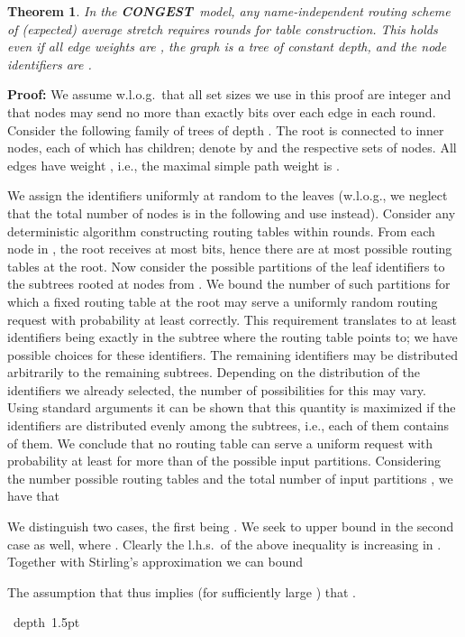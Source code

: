 \documentclass[letterpaper,11pt]{article}
\newtheorem{theorem}{Theorem}[section]
\newcommand{\blackslug}{\hbox{\hskip 1pt \vrule width 4pt height 8pt
depth 1.5pt \hskip 1pt}}
\newcommand{\QED}{\quad\blackslug\lower 8.5pt\null\par}
\newenvironment{proof}[1][Proof:]{\noindent \textbf{#1}\xspace}{\QED}
\newcommand{\CONGEST}{\textbf{CONGEST}}
\begin{document}
\begin{theorem}\label{thm:lower_route_independent}
In the \CONGEST\ model, any name-independent routing scheme of (expected)
average stretch  requires  rounds for table
construction. This holds even if all edge weights are , the graph is a tree
of constant depth, and the node identifiers are .
\end{theorem}
\begin{proof}
We assume w.l.o.g.\ that all set sizes we use in this proof are integer and that
nodes may send no more than exactly  bits over each edge in each
round. Consider the following family of trees of depth . The root is
connected to  inner nodes, each of which has 
children; denote by  and  the respective sets of nodes. All edges have
weight , i.e., the maximal simple path weight is .

We assign the identifiers  uniformly at random to the 
leaves (w.l.o.g., we neglect that the total number of nodes is  in
the following and use  instead). Consider any deterministic algorithm
constructing routing tables within  rounds. From each node in , the
root receives at most  bits, hence there are at most  possible routing tables at the root. Now consider the 
possible partitions of the leaf identifiers to the subtrees rooted at nodes from
. We bound the number of such partitions for which a fixed routing table at
the root may serve a uniformly random routing request with probability at least 
correctly. This requirement translates to at least  identifiers being
exactly in the subtree where the routing table points to; we have
 possible choices for these identifiers. The remaining 
identifiers may be distributed arbitrarily to the remaining subtrees. Depending
on the distribution of the  identifiers we already selected, the number of
possibilities for this may vary. Using standard arguments it can be shown that this quantity is maximized if the  identifiers are
distributed evenly among the subtrees, i.e., each of them contains  of
them. We conclude that no routing table can serve a uniform request with
probability at least  for more than
 of the possible input partitions.
Considering the number possible routing tables and the total number of input
partitions , we have that


We distinguish two cases, the first being . We seek to upper
bound  in the second case as well, where . Clearly the l.h.s.\
of the above inequality is increasing in . Together with Stirling's
approximation  we can bound

The assumption that  thus implies (for sufficiently large )
that .


\end{proof}
\end{document}
